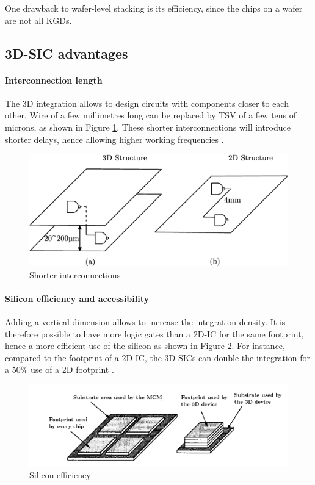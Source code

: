 One drawback to wafer-level stacking is its efficiency, since the chips on a wafer are not all KGDs.

\subsection{3D-SIC advantages}

\paragraph{Interconnection length}

The 3D integration allows to design circuits with components closer to each other. Wire of a few millimetres long can be replaced by TSV of a few tens of microns, as shown in Figure \ref{fig:wire}. These shorter interconnections will introduce shorter delays, hence allowing higher working frequencies \cite{659500,981091}.

\begin{figure}[h!]
\begin{center}
\includegraphics[width=0.8\linewidth]{wire.eps}
\end{center}
\vspace{-0.5cm}
\caption{Shorter interconnections \cite{659500}}
\label{fig:wire}
\end{figure}

\paragraph{Silicon efficiency and accessibility}

Adding a vertical dimension allows to increase the integration density. It is therefore possible to have more logic gates than a 2D-IC for the same footprint, hence a more efficient use of the silicon as shown in Figure \ref{fig:footprint}. For instance, compared to the footprint of a 2D-IC, the 3D-SICs can double the integration for a 50\% use of a 2D footprint \cite{659500}.

\begin{figure}[h!]
\begin{center}
\includegraphics[width=0.8\linewidth]{footprint.png}
\end{center}
\vspace{-0.5cm}
\caption{Silicon efficiency \cite{659500}}
\label{fig:footprint}
\end{figure}


